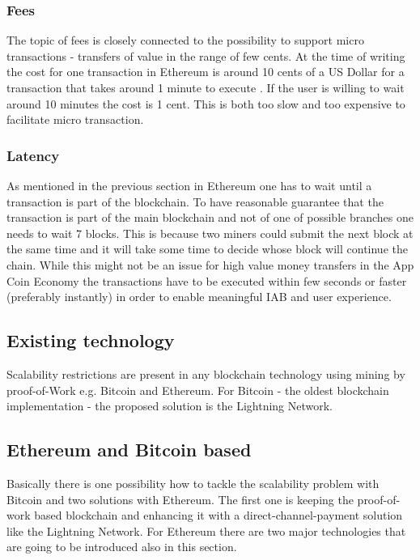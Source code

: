 \subsubsection{Fees}
The topic of fees is closely connected to the possibility to support micro transactions - transfers of value in the range of few cents. At the time of writing the cost for one transaction in Ethereum is around 10 cents of a US Dollar for a transaction that takes around 1 minute to execute \cite{eth_gasstation}. If the user is willing to wait around 10 minutes the cost is 1 cent. This is both too slow and too expensive to facilitate micro transaction.

\subsubsection{Latency}
As mentioned in the previous section in Ethereum one has to wait until a transaction is part of the blockchain. To have reasonable guarantee that the transaction is part of the main blockchain and not of one of possible branches one needs to wait 7 blocks. This is because two miners could submit the next block at the same time and it will take some time to decide whose block will continue the chain. While this might not be an issue for high value money transfers in the App Coin Economy the transactions have to be executed within few seconds or faster (preferably instantly) in order to enable meaningful IAB and user experience.

\subsection{Existing technology}
Scalability restrictions are present in any blockchain technology using mining by proof-of-Work e.g. Bitcoin and Ethereum. For Bitcoin - the oldest blockchain implementation - the proposed solution is the Lightning Network.


\subsection{Ethereum and Bitcoin based}

Basically there is one possibility how to tackle the scalability problem with Bitcoin and two solutions with Ethereum. The first one is keeping the proof-of-work based blockchain and enhancing it with a direct-channel-payment solution like the Lightning Network. For Ethereum there are two major technologies that are going to be introduced also in this section.

